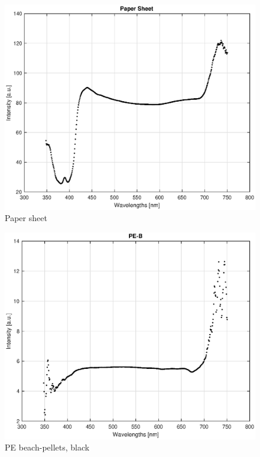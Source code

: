 \begin{appendices}
\begin{figure}
    \centering
    \includegraphics[width = 12cm]{Images/appendix/papersheet.eps}
    \caption{Paper sheet}
    \label{fig:paper}
\end{figure}

\begin{figure}
    \centering
    \includegraphics[width = 12cm]{Images/appendix/pe-beach-black.eps}
    \caption{PE beach-pellets, black}
    \label{fig:pe_beach_b}
\end{figure}


\end{appendices}
